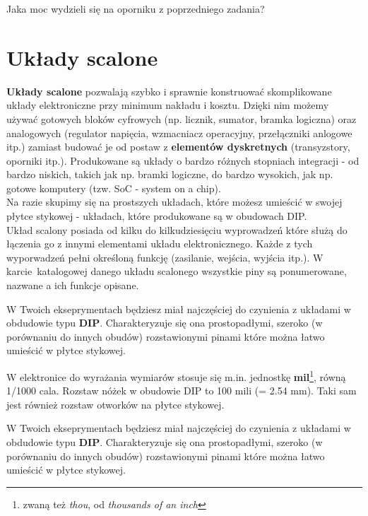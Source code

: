 \documentclass{pdfBooklets}
\begin{document}
\begin{Zadanie}{}{}
  Jaka moc wydzieli się na oporniku z poprzedniego zadania?
\end{Zadanie}


\section{Układy scalone}
\textbf{Układy scalone} pozwalają szybko i sprawnie konstruować skomplikowane układy elektroniczne przy minimum nakładu i kosztu. Dzięki nim możemy
używać gotowych bloków cyfrowych (np. licznik, sumator, bramka logiczna) oraz analogowych (regulator napięcia, wzmacniacz operacyjny,
przełączniki anlogowe itp.) zamiast budować je od postaw z \textbf{elementów dyskretnych} (transyzstory, oporniki itp.). Produkowane są
układy o bardzo różnych stopniach integracji - od bardzo niskich, takich jak np. bramki logiczne, do bardzo wysokich, jak np. gotowe komputery
(tzw. SoC - system on a chip).
\\

Na razie skupimy się na prostszych układach, które możesz umieścić w swojej płytce stykowej - układach, które produkowane są w obudowach DIP.\\

Układ scalony posiada od kilku do kilkudziesięciu wyprowadzeń które służą do łączenia go z innymi elementami układu elektronicznego.
Każde z tych wyporwadzeń pełni określoną funkcję (zasilanie, wejścia, wyjścia itp.). W karcie~katalogowej danego układu scalonego wszystkie
piny są ponumerowane, nazwane a ich funkcje opisane.

W Twoich ekseprymentach będziesz miał najczęściej do czynienia z układami w obdudowie typu \textbf{DIP}. Charakteryzuje się ona prostopadłymi,
szeroko (w porównaniu do innych obudów) rozstawionymi pinami które można łatwo umieścić w płytce stykowej.

\begin{ProTip}{}
  W elektronice do wyrażania wymiarów stosuje się m.in. jednostkę \textbf{mil}\footnote{zwaną też \textit{thou}, od \textit{thousands of an inch}},
  równą 1/1000 cala. Rozstaw nóżek w obudowie DIP to 100 mili (= 2.54 mm). Taki sam jest również rozstaw otworków na płytce stykowej.
\end{ProTip}

W Twoich ekseprymentach będziesz miał najczęściej do czynienia z układami w obdudowie typu \textbf{DIP}. Charakteryzuje się ona prostopadłymi,
szeroko (w porównaniu do innych obudów) rozstawionymi pinami które można łatwo umieścić w płytce stykowej.
\end{document}
